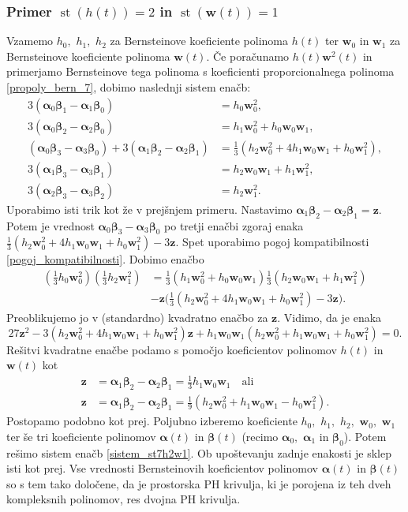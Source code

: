 \documentclass[12pt,a4paper,twoside]{article}
\theoremstyle{definition} %
\theoremstyle{plain} %
\numberwithin{equation}{section}  %
\newcommand{\wV}{\mathbf{w}}
\newcommand{\zV}{\mathbf{z}}
\newcommand{\balpha}{\boldsymbol \alpha}
\newcommand{\bbeta}{\boldsymbol \beta}
\DeclareMathOperator{\st}{st}
\begin{document}
\subsubsection*{Primer $\st(h(t))=2$ in $\st(\wV(t))=1$}

Vzamemo $h_0,$ $h_1,$ $h_2$ za Bernsteinove koeficiente polinoma $h(t)$ ter $\wV_0$ in $\wV_1$ za Bernsteinove koeficiente polinoma $\wV(t).$ Če poračunamo $h(t)\wV^2(t)$ in primerjamo Bernsteinove tega polinoma s koeficienti proporcionalnega polinoma \eqref{propoly_bern_7}, dobimo naslednji sistem enačb:
\begin{align}
	3(\balpha_0\bbeta_1-\balpha_1\bbeta_0)&=h_0\wV_0^2,\nonumber\\
	3(\balpha_0\bbeta_2-\balpha_2\bbeta_0)&=h_1\wV_0^2+h_0\wV_0\wV_1,\nonumber\\
	(\balpha_0\bbeta_3-\balpha_3\bbeta_0)+3(\balpha_1\bbeta_2-\balpha_2\bbeta_1)&=\frac{1}{3}(h_2\wV_0^2+4h_1\wV_0\wV_1+h_0\wV_1^2),\nonumber\\
	3(\balpha_1\bbeta_3-\balpha_3\bbeta_1)&=h_2\wV_0\wV_1+h_1\wV_1^2,\nonumber\\
	3(\balpha_2\bbeta_3-\balpha_3\bbeta_2)&=h_2\wV_1^2.\label{sistem_st7h2w1}
\end{align}
Uporabimo isti trik kot že v prejšnjem primeru. Nastavimo $\balpha_1\bbeta_2-\balpha_2\bbeta_1=\zV.$ Potem je vrednost $\balpha_0\bbeta_3-\balpha_3\bbeta_0$ po tretji enačbi zgoraj enaka $\frac{1}{3}(h_2\wV_0^2+4h_1\wV_0\wV_1+h_0\wV_1^2)-3\zV.$ Spet uporabimo pogoj kompatibilnosti \eqref{pogoj_kompatibilnosti}. Dobimo enačbo
\begin{align*}
	\left(\frac{1}{3}h_0\wV_0^2\right)\left(\frac{1}{3}h_2\wV_1^2\right)&=\frac{1}{3}(h_1\wV_0^2+h_0\wV_0\wV_1)\frac{1}{3}(h_2\wV_0\wV_1+h_1\wV_1^2)\nonumber\\
	&-\zV\Big(\frac{1}{3}(h_2\wV_0^2+4h_1\wV_0\wV_1+h_0\wV_1^2)-3\zV\Big).
\end{align*}
Preoblikujemo jo v (standardno) kvadratno enačbo za $\zV.$ Vidimo, da je enaka
\begin{equation*}
	27\zV^2-3(h_2\wV_0^2+4h_1\wV_0\wV_1+h_0\wV_1^2)\zV+h_1\wV_0\wV_1(h_2\wV_0^2+h_1\wV_0\wV_1+h_0\wV_1^2)=0.
\end{equation*}
Rešitvi kvadratne enačbe podamo s pomočjo koeficientov polinomov $h(t)$ in $\wV(t)$ kot
\begin{align}
	\zV&=\balpha_1\bbeta_2-\balpha_2\bbeta_1=\frac{1}{3}h_1\wV_0\wV_1\quad\text{ali}\nonumber\\
	\zV&=\balpha_1\bbeta_2-\balpha_2\bbeta_1=\frac{1}{9}(h_2\wV_0^2+h_1\wV_0\wV_1-h_0\wV_1^2).\label{st7h2w1}
\end{align}
Postopamo podobno kot prej. Poljubno izberemo koeficiente $h_0,$ $h_1,$ $h_2,$ $\wV_0,$ $\wV_1$ ter še tri koeficiente polinomov $\balpha(t)$ in $\bbeta(t)$ (recimo $\balpha_0,$ $\balpha_1$ in $\bbeta_0$). Potem rešimo sistem enačb \eqref{sistem_st7h2w1}. Ob upoštevanju zadnje enakosti je sklep isti kot prej. Vse vrednosti Bernsteinovih koeficientov polinomov $\balpha(t)$ in $\bbeta(t)$ so s tem tako določene, da je prostorska PH krivulja, ki je porojena iz teh dveh kompleksnih polinomov, res dvojna PH krivulja.
\end{document}
